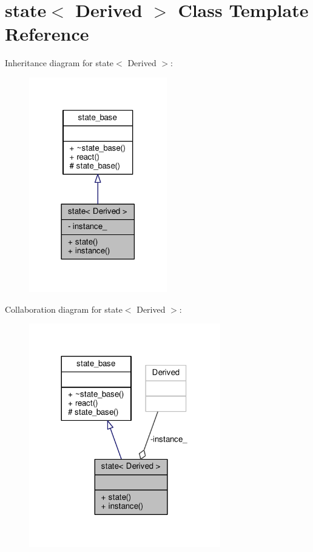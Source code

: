 \hypertarget{classstate}{}\section{state$<$ Derived $>$ Class Template Reference}
\label{classstate}


Inheritance diagram for state$<$ Derived $>$\+:
\nopagebreak
\begin{figure}[H]
\begin{center}
\leavevmode
\includegraphics[width=170pt]{classstate__inherit__graph}
\end{center}
\end{figure}


Collaboration diagram for state$<$ Derived $>$\+:
\nopagebreak
\begin{figure}[H]
\begin{center}
\leavevmode
\includegraphics[width=236pt]{classstate__coll__graph}
\end{center}
\end{figure}
